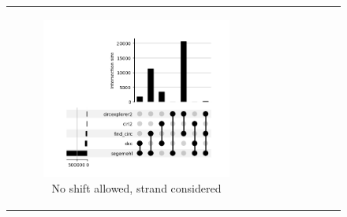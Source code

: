 \begin{figure}[ht] \begin{tabular}{cc} \begin{subfigure}{.5\textwidth}
                                           \centering

                                           \includegraphics[width=\linewidth]{chapters/4_results_and_discussion/figures/detection/upset/diff_0_strand.png}
                                           \caption{No shift allowed, strand
                                               considered}
                                           \label{fig:detection_upset_0_strand}
                                       \end{subfigure} &
               \begin{subfigure}{.5\textwidth} \centering


\end{subfigure}
\end{tabular}
\end{figure}
